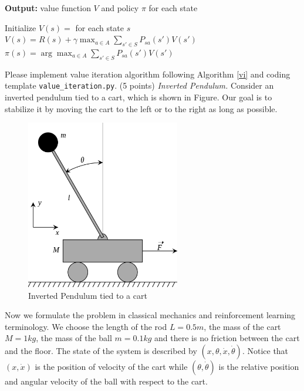 \documentclass[a4paper, 12pt]{exam}
\begin{document}
\begin{questions}
\begin{algorithm}[H]
\hspace*{0.02in}
{\bf Output: } value function $V$ and policy $\pi$
for each state
\begin{algorithmic}[1]
\State Initialize $V(s)=$ for each state $s$
\State $V(s) = R(s) + \gamma \max_{a\in A}\sum_{s'\in S}P_{sa}(s')V(s')$
\EndFor
\EndWhile
{}
\State $\pi(s)=\arg\max_{a\in A}\sum_{s'\in S}P_{sa}(s')V(s')$
\EndFor
\end{algorithmic}
\end{algorithm}		
Please implement value iteration
algorithm following Algorithm \ref{vi} and coding template
\texttt{value\_iteration.py}.
		\question (5 points) \emph{Inverted Pendulum. } Consider an inverted pendulum tied to a cart, which is shown in Figure. Our goal is to stabilize it by moving the cart
to the left or to the right as long as possible.
\begin{figure}[!ht]
    \centering
    \includegraphics[width=0.6\textwidth]{450px-Cart-pendulum.png}
    \caption{Inverted Pendulum tied to a cart}
    \label{fig:my_label}
\end{figure}
Now we formulate the problem in classical mechanics and reinforcement learning terminology.
We choose the length of the rod $L = 0.5 m$, the mass of the cart $M=1 kg$, the mass of the ball $m=0.1 kg$
and there is no friction between the cart and the floor.
The state of the system is described by
$(x, \theta, \dot{x}, \dot{\theta})$. Notice that $(x, \dot{x})$ is the position of velocity of the cart while
$(\theta, \dot{\theta})$ is the relative position and angular velocity of the ball with respect to the cart.


\end{questions}
\end{document}
